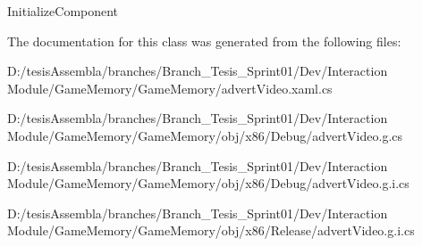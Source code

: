 Initialize\-Component 



The documentation for this class was generated from the following files\-:\begin{DoxyCompactItemize}
\item 
D\-:/tesis\-Assembla/branches/\-Branch\-\_\-\-Tesis\-\_\-\-Sprint01/\-Dev/\-Interaction Module/\-Game\-Memory/\-Game\-Memory/advert\-Video.\-xaml.\-cs\item 
D\-:/tesis\-Assembla/branches/\-Branch\-\_\-\-Tesis\-\_\-\-Sprint01/\-Dev/\-Interaction Module/\-Game\-Memory/\-Game\-Memory/obj/x86/\-Debug/advert\-Video.\-g.\-cs\item 
D\-:/tesis\-Assembla/branches/\-Branch\-\_\-\-Tesis\-\_\-\-Sprint01/\-Dev/\-Interaction Module/\-Game\-Memory/\-Game\-Memory/obj/x86/\-Debug/advert\-Video.\-g.\-i.\-cs\item 
D\-:/tesis\-Assembla/branches/\-Branch\-\_\-\-Tesis\-\_\-\-Sprint01/\-Dev/\-Interaction Module/\-Game\-Memory/\-Game\-Memory/obj/x86/\-Release/advert\-Video.\-g.\-i.\-cs\end{DoxyCompactItemize}
